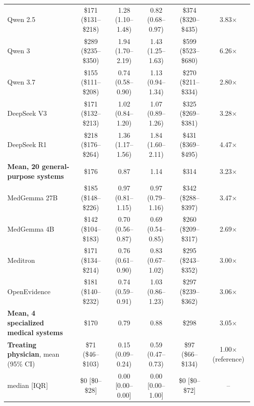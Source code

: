 \begin{tabular}{l c c c c c}
Qwen 2.5 & \$171 (\$131--\$218) & 1.28 (1.10--1.48) & 0.82 (0.68--0.97) & \$374 (\$320--\$435) & 3.83$\times$ \\
Qwen 3 & \$289 (\$235--\$350) & 1.94 (1.70--2.19) & 1.43 (1.25--1.63) & \$599 (\$523--\$680) & 6.26$\times$ \\
Qwen 3.7 & \$155 (\$111--\$208) & 0.74 (0.58--0.90) & 1.13 (0.94--1.34) & \$270 (\$211--\$334) & 2.80$\times$ \\
DeepSeek V3 & \$171 (\$132--\$213) & 1.02 (0.84--1.20) & 1.07 (0.89--1.26) & \$325 (\$269--\$381) & 3.28$\times$ \\
DeepSeek R1 & \$218 (\$176--\$264) & 1.36 (1.17--1.56) & 1.84 (1.60--2.11) & \$431 (\$369--\$495) & 4.47$\times$ \\
\midrule
\textbf{Mean, 20 general-purpose systems} & \$176 & 0.87 & 1.14 & \$314 & 3.23$\times$ \\
\midrule
MedGemma 27B & \$185 (\$148--\$226) & 0.97 (0.81--1.15) & 0.97 (0.79--1.16) & \$342 (\$288--\$397) & 3.47$\times$ \\
MedGemma 4B & \$142 (\$104--\$183) & 0.70 (0.56--0.87) & 0.69 (0.54--0.85) & \$260 (\$209--\$317) & 2.69$\times$ \\
Meditron & \$171 (\$134--\$214) & 0.76 (0.61--0.90) & 0.83 (0.67--1.02) & \$295 (\$243--\$352) & 3.00$\times$ \\
OpenEvidence & \$181 (\$140--\$232) & 0.74 (0.59--0.91) & 1.03 (0.86--1.23) & \$297 (\$239--\$362) & 3.06$\times$ \\
\midrule
\textbf{Mean, 4 specialized medical systems} & \$170 & 0.79 & 0.88 & \$298 & 3.05$\times$ \\
\midrule
\rowcolor{gray!8} \textbf{Treating physician}, mean (95\% CI) & \$71 (\$46--\$103) & 0.15 (0.09--0.24) & 0.59 (0.47--0.73) & \$97 (\$66--\$134) & 1.00$\times$ (reference) \\
\rowcolor{gray!8} \quad median [IQR] & \$0 [\$0--\$28] & 0.00 [0.00--0.00] & 0.00 [0.00--1.00] & \$0 [\$0--\$72] & -- \\
\bottomrule
\end{tabular}
